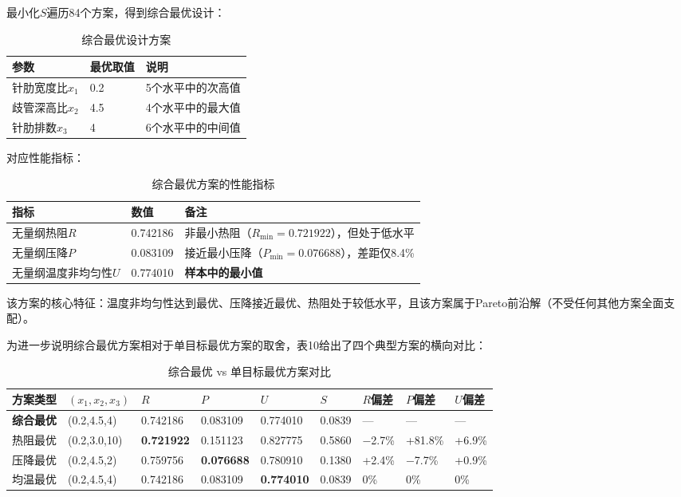 \documentclass[12pt,a4paper]{ctexart}
\begin{document}
最小化$S$遍历84个方案，得到综合最优设计：

\begin{table}[H]
\centering
\caption{综合最优设计方案}
\footnotesize
\begin{tabular}{p{}p{}p{}}
\toprule
参数 & 最优取值 & 说明 \\
\midrule
针肋宽度比$x_1$ & 0.2 & 5个水平中的次高值 \\
歧管深高比$x_2$ & 4.5 & 4个水平中的最大值 \\
针肋排数$x_3$ & 4 & 6个水平中的中间值 \\
\bottomrule
\end{tabular}
\end{table}

对应性能指标：

\begin{table}[H]
\centering
\caption{综合最优方案的性能指标}
\footnotesize
\begin{tabular}{p{}p{}p{}}
\toprule
指标 & 数值 & 备注 \\
\midrule
无量纲热阻$R$ & 0.742186 & 非最小热阻（$R_{\min}=0.721922$），但处于低水平 \\
无量纲压降$P$ & 0.083109 & 接近最小压降（$P_{\min}=0.076688$），差距仅8.4\% \\
无量纲温度非均匀性$U$ & 0.774010 & \textbf{样本中的最小值} \\
\bottomrule
\end{tabular}
\end{table}

该方案的核心特征：温度非均匀性达到最优、压降接近最优、热阻处于较低水平，且该方案属于Pareto前沿解（不受任何其他方案全面支配）。

为进一步说明综合最优方案相对于单目标最优方案的取舍，表10给出了四个典型方案的横向对比：

\begin{table}[H]
\centering
\caption{综合最优 vs 单目标最优方案对比}
\footnotesize
\begin{tabular}{p{}p{}p{}p{}p{}p{}p{}p{}p{}}
\toprule
方案类型 & $(x_1,x_2,x_3)$ & $R$ & $P$ & $U$ & $S$ & $R$偏差 & $P$偏差 & $U$偏差 \\
\midrule
\textbf{综合最优} & (0.2,4.5,4) & 0.742186 & 0.083109 & 0.774010 & 0.0839 & — & — & — \\
热阻最优 & (0.2,3.0,10) & \textbf{0.721922} & 0.151123 & 0.827775 & 0.5860 & $-$2.7\% & +81.8\% & +6.9\% \\
压降最优 & (0.2,4.5,2) & 0.759756 & \textbf{0.076688} & 0.780910 & 0.1380 & +2.4\% & $-$7.7\% & +0.9\% \\
均温最优 & (0.2,4.5,4) & 0.742186 & 0.083109 & \textbf{0.774010} & 0.0839 & 0\% & 0\% & 0\% \\
\bottomrule
\end{tabular}
\end{table}
\end{document}
